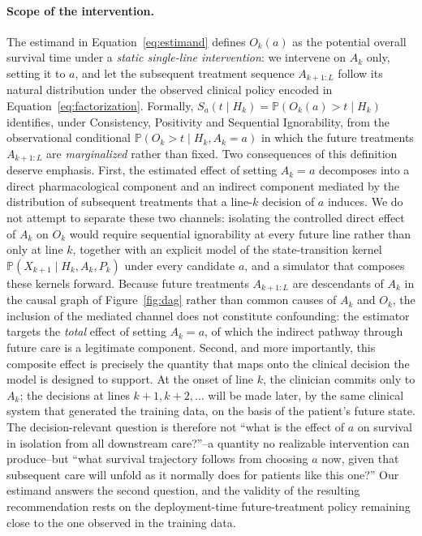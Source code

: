 \documentclass[a4paper,10pt]{article}
\begin{document}
\paragraph{Scope of the intervention.}
The estimand in Equation~\ref{eq:estimand} defines $O_k(a)$ as the potential overall survival time under a \emph{static single-line intervention}: we intervene on $A_k$ only, setting it to $a$, and let the subsequent treatment sequence $A_{k+1:L}$ follow its natural distribution under the observed clinical policy encoded in Equation~\ref{eq:factorization}. Formally, $S_a(t \mid H_k) = \mathbb{P}(O_k(a) > t \mid H_k)$ identifies, under Consistency, Positivity and Sequential Ignorability, from the observational conditional $\mathbb{P}(O_k > t \mid H_k, A_k = a)$ in which the future treatments $A_{k+1:L}$ are \emph{marginalized} rather than fixed. Two consequences of this definition deserve emphasis. First, the estimated effect of setting $A_k = a$ decomposes into a direct pharmacological component and an indirect component mediated by the distribution of subsequent treatments that a line-$k$ decision of $a$ induces. We do not attempt to separate these two channels: isolating the controlled direct effect of $A_k$ on $O_k$ would require sequential ignorability at every future line rather than only at line $k$, together with an explicit model of the state-transition kernel $\mathbb{P}(X_{k+1} \mid H_k, A_k, P_k)$ under every candidate $a$, and a simulator that composes these kernels forward. Because future treatments $A_{k+1:L}$ are descendants of $A_k$ in the causal graph of Figure~\ref{fig:dag} rather than common causes of $A_k$ and $O_k$, the inclusion of the mediated channel does not constitute confounding: the estimator targets the \emph{total} effect of setting $A_k = a$, of which the indirect pathway through future care is a legitimate component. Second, and more importantly, this composite effect is precisely the quantity that maps onto the clinical decision the model is designed to support. At the onset of line $k$, the clinician commits only to $A_k$; the decisions at lines $k+1, k+2, \ldots$ will be made later, by the same clinical system that generated the training data, on the basis of the patient's future state. The decision-relevant question is therefore not ``what is the effect of $a$ on survival in isolation from all downstream care?''--a quantity no realizable intervention can produce--but ``what survival trajectory follows from choosing $a$ now, given that subsequent care will unfold as it normally does for patients like this one?'' Our estimand answers the second question, and the validity of the resulting recommendation rests on the deployment-time future-treatment policy remaining close to the one observed in the training data.
\end{document}
